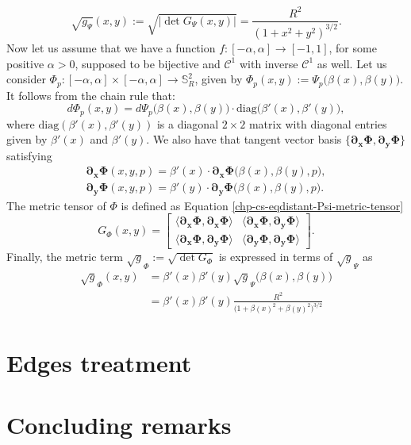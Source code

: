 \begin{equation*}
        \sqrt{g_{\Psi}}(x,y) :=
	\sqrt{|\det{G_{\Psi}(x,y)}|} = \frac{R^2}{(1+x^2+y^2)^{3/2}}.
\end{equation*}
Now let us assume that we have a function $f:[-\alpha,\alpha] \to [-1,1]$, for some positive $\alpha>0$,
supposed to be bijective and $\mathcal{C}^1$ with inverse $\mathcal{C}^1$ as well.
Let us consider $\Phi_p: [-\alpha,\alpha]\times [-\alpha,\alpha] \to \mathbb{S}^2_R$,
given by $\Phi_p(x,y) := \Psi_p\big(\beta(x),\beta(y)\big)$.
It follows from the chain rule that:
\begin{equation*}
        d\Phi_p(x,y) = d\Psi_p\big(\beta(x),\beta(y)\big)\cdot\text{diag}\big(\beta'(x),\beta'(y)\big),
\end{equation*}
where $\text{diag}(\beta'(x),\beta'(y))$ is a diagonal $2\times 2$ matrix with diagonal entries given by $\beta'(x)$ and $\beta'(y)$.
We also have that tangent vector basis $\{\boldsymbol{\partial_x \Phi},  \boldsymbol{\partial_y \Phi}\}$ satisfying
\begin{align*}
	\boldsymbol{\partial_x \Phi}(x,y,p) = \beta'(x) \cdot \boldsymbol{\partial_x \Phi}\big(\beta(x),\beta(y),p\big),\\
	\boldsymbol{\partial_y \Phi}(x,y,p) = \beta'(y) \cdot \boldsymbol{\partial_y \Phi}\big(\beta(x),\beta(y),p\big).
\end{align*}
The metric tensor of $\Phi$ is defined as Equation \eqref{chp-cs-eqdistant-Psi-metric-tensor}
\begin{equation*}
	\label{chp-cs-eqdistant-Phi-metric-tensor}
	G_{\Phi}(x,y) = 
	\begin{bmatrix}
		\langle  \boldsymbol{\partial_x \Phi}, \boldsymbol{\partial_x \Phi} \rangle & 
		\langle  \boldsymbol{\partial_x \Phi}, \boldsymbol{\partial_y \Phi} \rangle \\
		\langle  \boldsymbol{\partial_x \Phi}, \boldsymbol{\partial_y \Phi} \rangle  &
		\langle  \boldsymbol{\partial_y \Phi}, \boldsymbol{\partial_y \Phi} \rangle 
	\end{bmatrix}.
\end{equation*}
Finally, the metric term $\sqrt{g}_{\Phi}:= \sqrt{\det{G_{\Phi}}}$ is expressed in terms of $\sqrt{g}_{\Psi}$ as
\begin{align*}
    \sqrt{g}_{\Phi}(x,y) &= \beta'(x)\beta'(y)\sqrt{g}_{\Psi}\big(\beta(x),\beta(y)\big)\\
    &= \beta'(x)\beta'(y)\frac{R^2}{\big(1+\beta(x)^2+\beta(y)^2\big)^{3/2}}
\end{align*}
\section{Edges treatment}
\label{cs-halodata}

\section{Concluding remarks}
\label{cs-conc}
